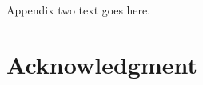 \documentclass[journal]{IEEEtran}
\begin{document}
\section{}
Appendix two text goes here.


\section*{Acknowledgment}




%
%
%
\begin{thebibliography}{1}


\end{thebibliography}

% 
\end{document}
